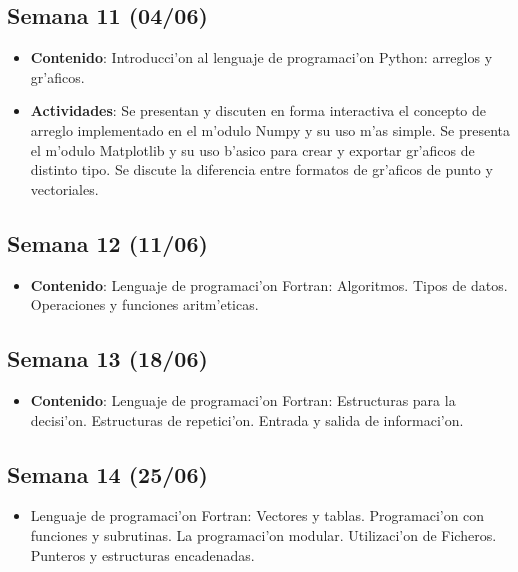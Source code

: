 \documentclass[letterpaper,11pt]{exam}
\begin{document}
\begin{multicols}{2}
\begin{scriptsize}
\subsection*{Semana 11 (04/06)}
\begin{itemize}
\item \textbf{Contenido}: Introducci'on al lenguaje de programaci'on Python: arreglos y gr'aficos. 
\item \textbf{Actividades}: Se presentan y discuten en forma interactiva el concepto de arreglo implementado en el m'odulo Numpy y su uso m'as simple. Se presenta el m'odulo Matplotlib y su uso b'asico para crear y exportar gr'aficos de distinto tipo. Se discute la diferencia entre formatos de gr'aficos de punto y vectoriales.
\end{itemize}

\subsection*{Semana 12 (11/06)}
\begin{itemize}
\item \textbf{Contenido}: Lenguaje de programaci'on Fortran: Algoritmos. Tipos de datos. Operaciones y funciones
aritm'eticas. 
\end{itemize}

\subsection*{Semana 13 (18/06)}
\begin{itemize}
\item \textbf{Contenido}: Lenguaje de programaci'on Fortran: Estructuras para la decisi'on. Estructuras de repetici'on. Entrada y salida de informaci'on.
\end{itemize}

\subsection*{Semana 14 (25/06)}
\begin{itemize}
\item Lenguaje de programaci'on Fortran: Vectores y tablas. Programaci'on con funciones y subrutinas. La programaci'on modular. Utilizaci'on de Ficheros. Punteros y estructuras encadenadas.
\end{itemize}
\end{scriptsize}
\end{multicols}
\end{document}
